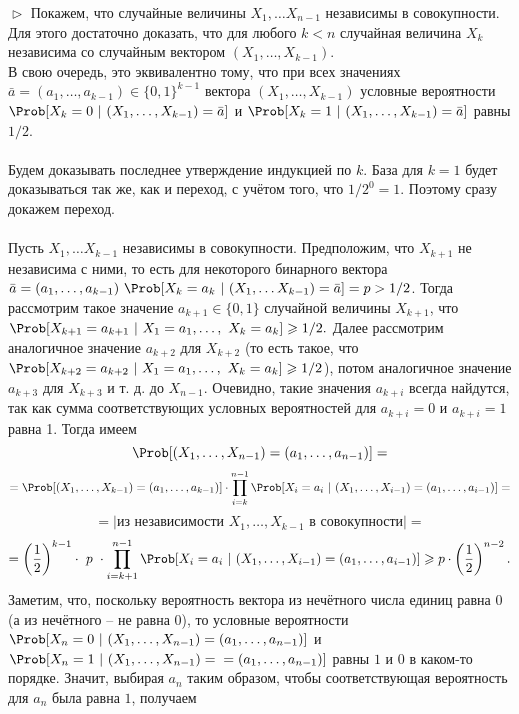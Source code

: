 \documentclass{article}
\renewcommand{\ge}{\geqslant}
\begin{document}
\begin{enumerate}
$\vartriangleright$  Покажем, что случайные величины $X_1, \ldots X_{n - 1}$ независимы в совокупности. Для этого достаточно доказать, что для любого $k < n$ случайная величина $X_k$ независима со случайным вектором $(X_1, \ldots, X_{k - 1})$. 
\\В свою очередь, это эквивалентно тому, что при всех значениях $\bar a = (a_1, \ldots, a_{k - 1}) \in \{0, 1\}^{k - 1}$ вектора $(X_1, \ldots, X_{k - 1})$ условные вероятности $\Prob[X_k = 0\ |\ (X_1, \ldots, X_{k - 1}) = \bar a]$ и $\Prob[X_k = 1\ |\ (X_1, \ldots, X_{k - 1}) = \bar a]$ равны $1/2$. 
\\\\Будем доказывать последнее утверждение индукцией по $k$. База для $k = 1$ будет доказываться так же, как и переход, с учётом того, что $1/2^0 = 1$. Поэтому сразу докажем переход. 
\\\\Пусть $X_1, \ldots X_{k - 1}$ независимы в совокупности. Предположим, что $X_{k + 1}$ не независима с ними, то есть для некоторого бинарного вектора $\bar a = (a_1, \ldots, a_{k - 1})\ \Prob[X_k = a_k\ |\ (X_1, \ldots X_{k - 1}) = \bar a] = p > 1/2$. Тогда рассмотрим такое значение $a_{k + 1} \in \{0, 1\}$ случайной величины $X_{k + 1}$, что $\Prob[X_{k + 1} = a_{k + 1}\ |\ X_1 = a_1, \ldots,\ X_k = a_k] \ge 1/2.$ Далее рассмотрим аналогичное значение $a_{k + 2}$ для $X_{k + 2}$ (то есть такое, что $\Prob[X_{k + 2} = a_{k + 2}\ |\ X_1 = a_1, \ldots,\ X_k = a_k] \ge 1/2$), потом аналогичное значение $a_{k + 3}$ для $X_{k + 3}$ и т. д. до $X_{n - 1}$. Очевидно, такие значения $a_{k + i}$ всегда найдутся, так как сумма соответствующих условных вероятностей для $a_{k + i} = 0$ и $a_{k + i} = 1$ равна 1. Тогда имеем
$$\Prob[(X_1, \ldots, X_{n - 1}) = (a_1, \ldots, a_{n - 1})] =$$
$$= \Prob[(X_1, \ldots, X_{k - 1}) = (a_1, \ldots, a_{k - 1})] \cdot \prod_{i = k}^{n - 1} \Prob[X_i = a_i\ |\ (X_1, \ldots, X_{i - 1}) = (a_1, \ldots, a_{i - 1})] =$$
\newpage
$$= |\text{из независимости $X_1, \ldots, X_{k - 1}$ в совокупности}| =$$
$$= \left(\frac{1}{2}\right)^{k - 1} \cdot\ p\ \cdot \prod_{i = k + 1}^{n - 1} \Prob[X_i = a_i\ |\ (X_1, \ldots, X_{i - 1}) = (a_1, \ldots, a_{i - 1})] \ge p \cdot \left(\frac{1}{2}\right)^{n - 2}.$$
Заметим, что, поскольку вероятность вектора из нечётного числа единиц равна $0$ (а из нечётного -- не равна 0), то условные вероятности $\Prob[X_n = 0\ |\ (X_1, \ldots, X_{n - 1}) = (a_1, \ldots, a_{n - 1})]$ и $\Prob[X_n = 1\ |\ (X_1, \ldots, X_{n - 1}) =\\= (a_1, \ldots, a_{n - 1})]$ равны $1$ и $0$ в каком-то порядке. Значит, выбирая $a_n$ таким образом, чтобы соответствующая вероятность для $a_n$ была равна $1$, получаем

\end{enumerate}
\end{document}
